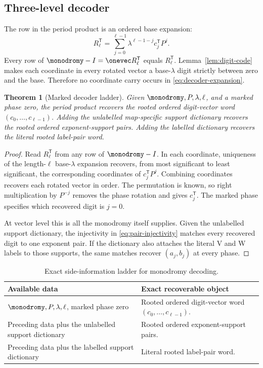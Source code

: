 \documentclass[11pt,letterpaper]{article}
\newtheorem{theorem}{Theorem}[section]
\theoremstyle{definition}
\theoremstyle{remark}
\numberwithin{equation}{section}
\begin{document}
\subsection{Three-level decoder}

The row in the period product is an ordered base expansion:
\begin{equation}
 R_\ell^{\mathsf T}
  =\sum_{j=0}^{\ell-1}
    \lambda^{\ell-1-j}c_j^{\mathsf T}P^j.
 \label{eq:decoder-expansion}
\end{equation}
Every row of \(\monodromy-I=\onevec R_\ell^{\mathsf T}\) equals
\(R_\ell^{\mathsf T}\).  Lemma~\ref{lem:digit-code} makes each coordinate
in every rotated vector a base-\(\lambda\) digit strictly between zero and
the base.  Therefore no coordinate carry occurs in
\eqref{eq:decoder-expansion}.

\begin{theorem}[Marked decoder ladder]
\label{thm:decoder}
Given \(\monodromy,P,\lambda,\ell\), and a marked phase zero, the period
product recovers the rooted ordered digit-vector word
\((c_0,\ldots,c_{\ell-1})\).  Adding the unlabelled map-specific support
dictionary recovers the rooted ordered exponent-support pairs.  Adding the
labelled dictionary recovers the literal rooted label-pair word.
\end{theorem}

\begin{proof}
Read \(R_\ell^{\mathsf T}\) from any row of \(\monodromy-I\).  In each
coordinate, uniqueness of the length-\(\ell\) base-\(\lambda\) expansion
recovers, from most significant to least significant, the corresponding
coordinates of \(c_j^{\mathsf T}P^j\).  Combining coordinates recovers each
rotated vector in order.  The permutation is known, so right multiplication
by \(P^{-j}\) removes the phase rotation and gives \(c_j^{\mathsf T}\).
The marked phase specifies which recovered digit is \(j=0\).

At vector level this is all the monodromy itself supplies.  Given the
unlabelled support dictionary, the injectivity in
\eqref{eq:pair-injectivity} matches every recovered digit to one exponent
pair.  If the dictionary also attaches the literal V and W labels to those
supports, the same matches recover \((a_j,b_j)\) at every phase.
\end{proof}

\begin{table}[t]
\centering
\caption{Exact side-information ladder for monodromy decoding.}
\label{tab:decoder}
\begin{tabularx}{\textwidth}{@{}p{}X@{}}
\toprule
Available data & Exact recoverable object \\
\midrule
\(\monodromy,P,\lambda,\ell\), marked phase zero
& Rooted ordered digit-vector word \((c_0,\ldots,c_{\ell-1})\). \\
Preceding data plus the unlabelled support dictionary
& Rooted ordered exponent-support pairs. \\
Preceding data plus the labelled support dictionary
& Literal rooted label-pair word. \\
\bottomrule
\end{tabularx}
\end{table}
\end{document}
